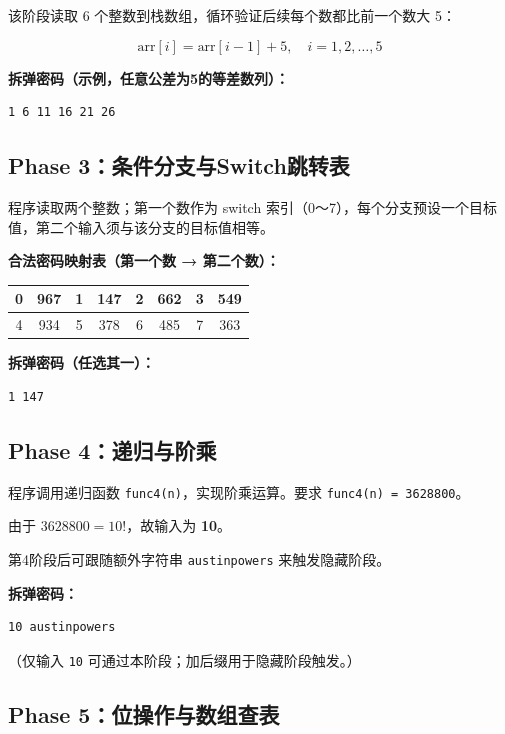 \documentclass[12pt, a4paper]{academics}
\begin{document}
该阶段读取 6 个整数到栈数组，循环验证后续每个数都比前一个数大 5：

\[ \text{arr}[i] = \text{arr}[i-1] + 5, \quad i = 1, 2, \ldots, 5 \]

\textbf{拆弹密码（示例，任意公差为5的等差数列）：}
\begin{verbatim}
1 6 11 16 21 26
\end{verbatim}

\subsection{Phase 3：条件分支与Switch跳转表}

程序读取两个整数；第一个数作为 switch 索引（0～7），每个分支预设一个目标值，第二个输入须与该分支的目标值相等。

\textbf{合法密码映射表（第一个数 → 第二个数）：}

\begin{center}
\begin{tabular}{|cc|cc|cc|cc|}
\hline
0 & 967 & 1 & 147 & 2 & 662 & 3 & 549 \\
\hline
4 & 934 & 5 & 378 & 6 & 485 & 7 & 363 \\
\hline
\end{tabular}
\end{center}

\textbf{拆弹密码（任选其一）：}
\begin{verbatim}
1 147
\end{verbatim}

\subsection{Phase 4：递归与阶乘}

程序调用递归函数 \texttt{func4(n)}，实现阶乘运算。要求 \texttt{func4(n) = 3628800}。

由于 $3628800 = 10!$，故输入为 \textbf{10}。

第4阶段后可跟随额外字符串 \texttt{austinpowers} 来触发隐藏阶段。

\textbf{拆弹密码：}
\begin{verbatim}
10 austinpowers
\end{verbatim}

（仅输入 \texttt{10} 可通过本阶段；加后缀用于隐藏阶段触发。）

\subsection{Phase 5：位操作与数组查表}
\end{document}
